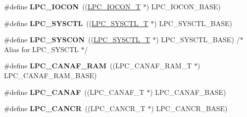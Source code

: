 \begin{DoxyCompactItemize}
\item 
\hypertarget{group___p_e_r_i_p_h__175_x__6_x___b_a_s_e_gaabc651799ba17b0dd4a0114c8d48a145}{\#define {\bfseries L\+P\+C\+\_\+\+I\+O\+C\+O\+N}~((\hyperlink{struct_l_p_c___i_o_c_o_n___t}{L\+P\+C\+\_\+\+I\+O\+C\+O\+N\+\_\+\+T}            $\ast$) L\+P\+C\+\_\+\+I\+O\+C\+O\+N\+\_\+\+B\+A\+S\+E)}\label{group___p_e_r_i_p_h__175_x__6_x___b_a_s_e_gaabc651799ba17b0dd4a0114c8d48a145}

\item 
\hypertarget{group___p_e_r_i_p_h__175_x__6_x___b_a_s_e_ga30cc92eba86b30295b3dcf3da503b736}{\#define {\bfseries L\+P\+C\+\_\+\+S\+Y\+S\+C\+T\+L}~((\hyperlink{struct_l_p_c___s_y_s_c_t_l___t}{L\+P\+C\+\_\+\+S\+Y\+S\+C\+T\+L\+\_\+\+T}           $\ast$) L\+P\+C\+\_\+\+S\+Y\+S\+C\+T\+L\+\_\+\+B\+A\+S\+E)}\label{group___p_e_r_i_p_h__175_x__6_x___b_a_s_e_ga30cc92eba86b30295b3dcf3da503b736}

\item 
\hypertarget{group___p_e_r_i_p_h__175_x__6_x___b_a_s_e_gabe45c10a979fe812e3d9ecd72fe33a2f}{\#define {\bfseries L\+P\+C\+\_\+\+S\+Y\+S\+C\+O\+N}~((\hyperlink{struct_l_p_c___s_y_s_c_t_l___t}{L\+P\+C\+\_\+\+S\+Y\+S\+C\+T\+L\+\_\+\+T}           $\ast$) L\+P\+C\+\_\+\+S\+Y\+S\+C\+T\+L\+\_\+\+B\+A\+S\+E) /$\ast$ Alias for L\+P\+C\+\_\+\+S\+Y\+S\+C\+T\+L $\ast$/}\label{group___p_e_r_i_p_h__175_x__6_x___b_a_s_e_gabe45c10a979fe812e3d9ecd72fe33a2f}

\item 
\hypertarget{group___p_e_r_i_p_h__175_x__6_x___b_a_s_e_gaf02b7bcdc41a045910b3f0bae8a8f4b0}{\#define {\bfseries L\+P\+C\+\_\+\+C\+A\+N\+A\+F\+\_\+\+R\+A\+M}~((L\+P\+C\+\_\+\+C\+A\+N\+A\+F\+\_\+\+R\+A\+M\+\_\+\+T        $\ast$) L\+P\+C\+\_\+\+C\+A\+N\+A\+F\+\_\+\+R\+A\+M\+\_\+\+B\+A\+S\+E)}\label{group___p_e_r_i_p_h__175_x__6_x___b_a_s_e_gaf02b7bcdc41a045910b3f0bae8a8f4b0}

\item 
\hypertarget{group___p_e_r_i_p_h__175_x__6_x___b_a_s_e_ga4f738c971938302f38d54e662c9f7774}{\#define {\bfseries L\+P\+C\+\_\+\+C\+A\+N\+A\+F}~((L\+P\+C\+\_\+\+C\+A\+N\+A\+F\+\_\+\+T            $\ast$) L\+P\+C\+\_\+\+C\+A\+N\+A\+F\+\_\+\+B\+A\+S\+E)}\label{group___p_e_r_i_p_h__175_x__6_x___b_a_s_e_ga4f738c971938302f38d54e662c9f7774}

\item 
\hypertarget{group___p_e_r_i_p_h__175_x__6_x___b_a_s_e_gadc209557a5736e29149b96018056fc29}{\#define {\bfseries L\+P\+C\+\_\+\+C\+A\+N\+C\+R}~((L\+P\+C\+\_\+\+C\+A\+N\+C\+R\+\_\+\+T            $\ast$) L\+P\+C\+\_\+\+C\+A\+N\+C\+R\+\_\+\+B\+A\+S\+E)}\label{group___p_e_r_i_p_h__175_x__6_x___b_a_s_e_gadc209557a5736e29149b96018056fc29}


\end{DoxyCompactItemize}
